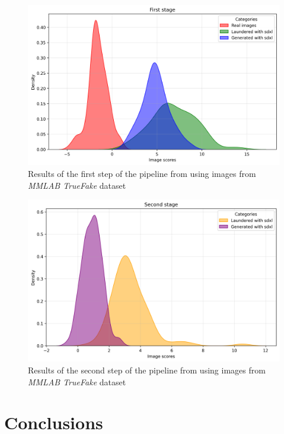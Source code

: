 \documentclass[conference]{IEEEtran} %
\begin{document}
    \begin{figure}[h]
        \centering
        \includegraphics[width=0.95\linewidth]{Img/first_stage.png}
        \caption{Results of the first step of the pipeline from \cite{mandelli2024synthetic} using images from \textit{MMLAB TrueFake} dataset}
        \label{fig:first_stage}
    \end{figure}

    \begin{figure}[h]
        \centering
        \includegraphics[width=0.95\linewidth]{Img/second_stage.png}
        \caption{Results of the second step of the pipeline from \cite{mandelli2024synthetic} using images from \textit{MMLAB TrueFake} dataset}
        \label{fig:second_stage}
    \end{figure}

\section{Conclusions}

\end{document}
